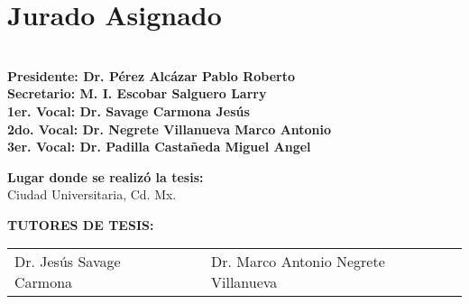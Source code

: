 \chapter*{Jurado Asignado}

\noindent\textbf{\large \phantom{space}\\
\vspace*{0.5cm}
Presidente: Dr. Pérez Alcázar Pablo Roberto\\
\vspace*{0.5cm}
Secretario: M. I. Escobar Salguero Larry\\
\vspace*{0.5cm}
1er. Vocal: Dr. Savage Carmona Jesús\\
\vspace*{0.5cm}
2do. Vocal: Dr. Negrete Villanueva Marco Antonio\\
\vspace*{0.5cm}
3er. Vocal: Dr. Padilla Castañeda Miguel Angel\\}

\vspace*{1.5cm}

\noindent\textbf{\large Lugar donde se realizó la tesis:} \vspace*{0.4cm}\\
{\large Ciudad Universitaria, Cd. Mx.}
\vspace*{1.5cm}

\qquad \qquad \qquad \qquad \qquad \textbf{\large TUTORES DE TESIS:}
\vspace*{2.5cm}\\

\begin{tabular}{p{}cp{}}
    \centering \large{Dr. Jesús Savage Carmona} & & \centering \large{Dr. Marco Antonio Negrete Villanueva} 
\end{tabular}